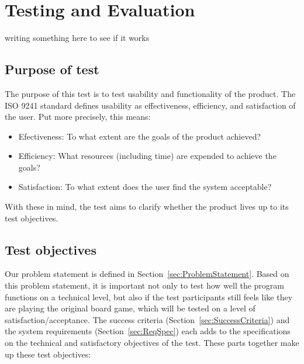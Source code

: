 \chapter{Testing and Evaluation}\label{ch:testeval}
writing something here to see if it works

\section{Purpose of test}
The purpose of this test is to test usability and functionality of the product. The ISO 9241 \citep{ISO} standard defines usability as effectiveness, efficiency, and satisfaction of the user. Put more precisely, this means:
\begin{itemize}
\item Efectiveness: To what extent are the goals of the product achieved?
\item Efficiency: What resources (including time) are expended to achieve the goals?
\item Satisfaction: To what extent does the user find the system acceptable?
\end{itemize}
With these in mind, the test aims to clarify whether the product lives up to its test objectives.

\section{Test objectives}
Our problem statement is defined in Section~\ref{sec:ProblemStatement}. Based on this problem statement, it is important not only to test how well the program functions on a technical level, but also if the test participants still feels like they are playing the original board game, which will be tested on a level of satisfaction/acceptance.
The success criteria (Section~\ref{sec:SuccessCriteria}) and the system requirements (Section~\ref{sec:ReqSpec}) each adds to the specifications on the technical and satisfactory  objectives of the test.
These parts together make up these test objectives:

